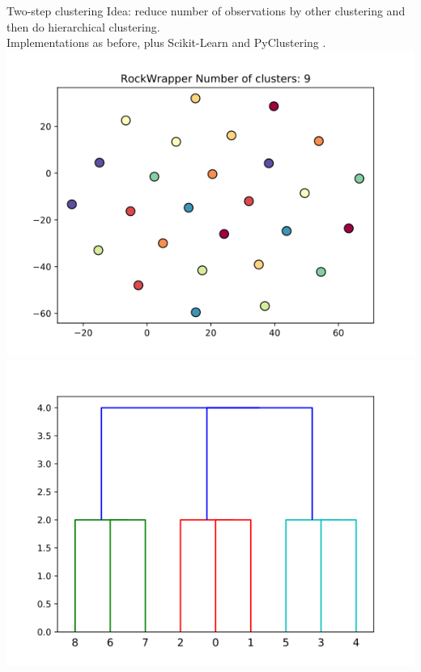 \documentclass[rgb]{beamer}
\begin{document}
    \begin{frame}{Two-step clustering}
        Idea: reduce number of observations by other clustering and then do hierarchical clustering. \\
        Implementations as before, plus Scikit-Learn \cite{scikit-learn} and PyClustering \cite{Novikov2019}. \\
        \centering\includegraphics[keepaspectratio,width=\textwidth, height=0.7\textheight]{graphics/aproaches/rock_noise_False_clusters.png}  \hspace{2cm}
        \includegraphics[keepaspectratio,width=\textwidth, height=0.7\textheight]{graphics/aproaches/rock_noise_False_dendro.png}
    \end{frame}
    
\end{document}
